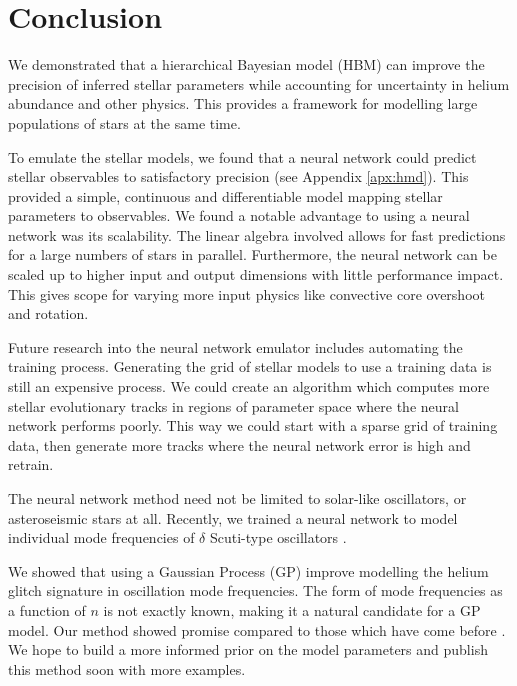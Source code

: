 %
%
%
%
%
\chapter{Conclusion}

We demonstrated that a hierarchical Bayesian model (HBM) can improve the precision of inferred stellar parameters while accounting for uncertainty in helium abundance and other physics. This provides a framework for modelling large populations of stars at the same time.

To emulate the stellar models, we found that a neural network could predict stellar observables to satisfactory precision (see Appendix \ref{apx:hmd}). This provided a simple, continuous and differentiable model mapping stellar parameters to observables. We found a notable advantage to using a neural network was its scalability. The linear algebra involved allows for fast predictions for a large numbers of stars in parallel. Furthermore, the neural network can be scaled up to higher input and output dimensions with little performance impact. This gives scope for varying more input physics like convective core overshoot and rotation.

Future research into the neural network emulator includes automating the training process. Generating the grid of stellar models to use a training data is still an expensive process. We could create an algorithm which computes more stellar evolutionary tracks in regions of parameter space where the neural network performs poorly. This way we could start with a sparse grid of training data, then generate more tracks where the neural network error is high and retrain.

The neural network method need not be limited to solar-like oscillators, or asteroseismic stars at all. Recently, we trained a neural network to model individual mode frequencies of \(\delta\) Scuti-type oscillators \citep{Scutt.Murphy.ea2023}.

We showed that using a Gaussian Process (GP) improve modelling the helium glitch signature in oscillation mode frequencies. The form of mode frequencies as a function of \(n\) is not exactly known, making it a natural candidate for a GP model. Our method showed promise compared to those which have come before \citep[e.g.][]{Verma.Raodeo.ea2019}. We hope to build a more informed prior on the model parameters and publish this method soon with more examples.


